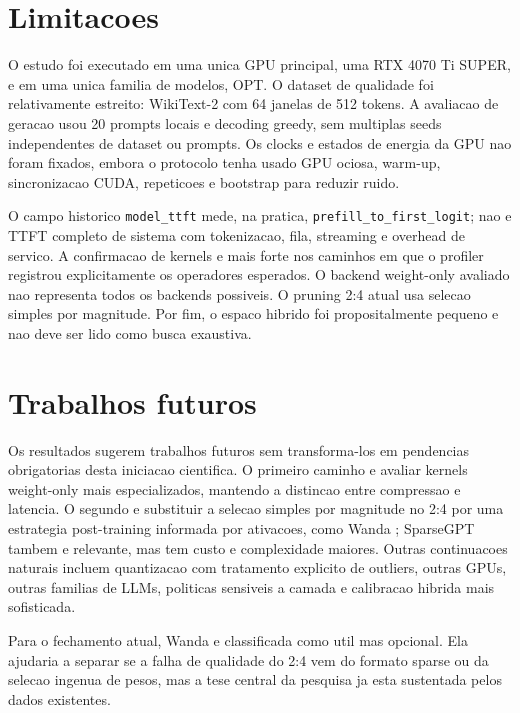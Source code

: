 \documentclass[12pt, a4paper]{article}
\begin{document}
\section{Limitacoes}

O estudo foi executado em uma unica GPU principal, uma RTX 4070 Ti SUPER, e em
uma unica familia de modelos, OPT. O dataset de qualidade foi relativamente
estreito: WikiText-2 com 64 janelas de 512 tokens. A avaliacao de geracao usou
20 prompts locais e decoding greedy, sem multiplas seeds independentes de
dataset ou prompts. Os clocks e estados de energia da GPU nao foram fixados,
embora o protocolo tenha usado GPU ociosa, warm-up, sincronizacao CUDA,
repeticoes e bootstrap para reduzir ruido.

O campo historico \texttt{model\_ttft} mede, na pratica,
\texttt{prefill\_to\_first\_logit}; nao e TTFT completo de sistema com
tokenizacao, fila, streaming e overhead de servico. A confirmacao de kernels e
mais forte nos caminhos em que o profiler registrou explicitamente os
operadores esperados. O backend weight-only avaliado nao representa todos os
backends possiveis. O pruning 2:4 atual usa selecao simples por magnitude. Por
fim, o espaco hibrido foi propositalmente pequeno e nao deve ser lido como busca
exaustiva.

\section{Trabalhos futuros}

Os resultados sugerem trabalhos futuros sem transforma-los em pendencias
obrigatorias desta iniciacao cientifica. O primeiro caminho e avaliar kernels
weight-only mais especializados, mantendo a distincao entre compressao e
latencia. O segundo e substituir a selecao simples por magnitude no 2:4 por uma
estrategia post-training informada por ativacoes, como Wanda
\cite{sun2024wanda}; SparseGPT \cite{frantar2023sparsegpt} tambem e relevante,
mas tem custo e complexidade maiores. Outras continuacoes naturais incluem
quantizacao com tratamento explicito de outliers, outras GPUs, outras familias
de LLMs, politicas sensiveis a camada e calibracao hibrida mais sofisticada.

Para o fechamento atual, Wanda e classificada como util mas opcional. Ela
ajudaria a separar se a falha de qualidade do 2:4 vem do formato sparse ou da
selecao ingenua de pesos, mas a tese central da pesquisa ja esta sustentada
pelos dados existentes.
\end{document}
